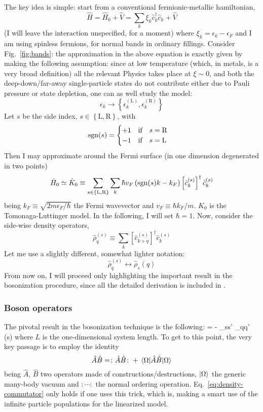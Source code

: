 The key idea is simple: start from a conventional fermionic-metallic hamiltonian,
\[
	\hat H = \hat H_0 + \hat V = \sum_k \xi_k \hat c_k^\dagger \hat c_k + \hat V
\]
(I will leave the interaction unspecified, for a moment) where $\xi_k = \epsilon_k - \epsilon_F$ and I am using spinless fermions, for normal bands in ordinary fillings.
Consider Fig.~\ref{fig:bands}: the approximation in the above equation is exactly given by making the following assumption: since at low temperature (which, in metals, is a very broad definition) all the relevant Physics takes place at $\xi \sim 0$, and both the deep-down/far-away single-particle states do not contribute either due to Pauli pressure or state depletion, one can as well study the model:
\[
	\epsilon_k \to \left\{\epsilon_k^{(\mathrm L)}, \epsilon_k^{(\mathrm R)} \right\}
\]
Let $s$ be the side index, $s \in \left\{\mathrm L, \mathrm R\right\}$, with
\[
\mathrm{sgn}(s) = \begin{cases}
	+1 \quad \text{if} \quad s = \mathrm R \\
	-1 \quad \text{if} \quad s = \mathrm L
\end{cases}
\]
Then I may approximate around the Fermi surface (in one dimension degenerated in two points)
\[
	\hat H_0 \simeq \hat K_0 \equiv \sum_{s \in \left\{\mathrm L, \mathrm R\right\}} \sum_k \hbar v_F \left( \mathrm{sgn}(s) k -  k_F \right) \left[ \hat c_k^{(s)} \right]^\dagger \hat c_k^{(s)}
\]
being $k_F \equiv \sqrt{2m\epsilon_F/\hbar}$ the Fermi wavevector and $v_F \equiv \hbar k_F / m$. $\hat K_0$ is the Tomonaga-Luttinger model. In the following, I will set $\hbar=1$. Now, consider the side-wise density operators,
\[
	\hat \rho_q^{(s)} \equiv \sum_k  \left[ \hat c_{k+q}^{(s)} \right]^\dagger \hat c_k^{(s)}
\]
Let me use a slightly different, somewhat lighter notation:
\[
	\hat \rho_q^{(s)} \leftrightarrow \hat \rho_s (q)
\]
From now on, I will proceed only highlighting the important result in the bosonization procedure, since all the detailed derivation is included in \cite{giamarchi2003quantum}.

\subsubsection{Boson operators}

The pivotal result in the bosonization technique is the following:
\beq\label{eq:density-commutator}
	 = - \delta_{ss'} \delta_{qq'} \sgn(s) 
\eeq
where $L$ is the one-dimensional system length.
To get to this point, the very key passage is to employ the identity
\[
	\hat A \hat B = \colon \hat A \hat B \colon + \mel{\Omega}{\hat A \hat B}{\Omega}
\]
being $\hat A$, $\hat B$ two operators made of constructions/destructions, $\ket{\Omega}$ the generic many-body vacuum and $\colon \cdots \colon$ the normal ordering operation. Eq.~\eqref{eq:density-commutator} only holds if one uses this trick, which is, making a smart use of the infinite particle populations for the linearized model.

